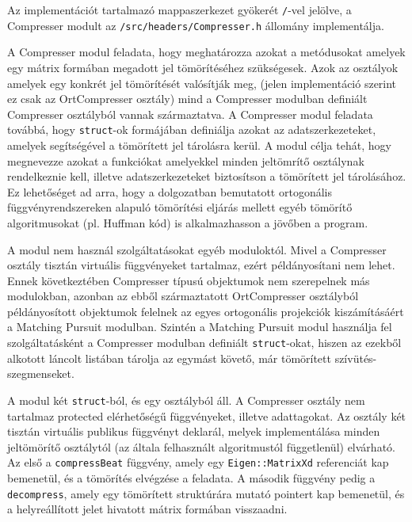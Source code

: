 \documentclass[oneside,titlepage,12pt,a4paper]{report}
\begin{document}
Az implementációt tartalmazó mappaszerkezet gyökerét \texttt{/}-vel jelölve, a Compresser modult  az \texttt{/src/headers/Compresser.h} állomány implementálja. 
\par A Compresser modul feladata, hogy meghatározza azokat a metódusokat amelyek egy mátrix formában megadott jel tömörítéséhez szükségesek. Azok az osztályok amelyek egy konkrét jel tömörítését valósítják meg, (jelen implementáció szerint ez csak az OrtCompresser osztály) mind a Compresser modulban definiált Compresser osztályból vannak származtatva. A Compresser modul feladata továbbá, hogy \texttt{struct}-ok formájában definiálja azokat az adatszerkezeteket, amelyek segítségével a tömörített jel tárolásra kerül. A modul célja tehát, hogy megnevezze azokat a funkciókat amelyekkel minden jeltömrítő osztálynak rendelkeznie kell, illetve adatszerkezeteket biztosítson a tömörített jel tárolásához. Ez lehetőséget ad arra, hogy a dolgozatban bemutatott ortogonális függvényrendszereken alapuló tömörítési eljárás mellett egyéb tömörítő algoritmusokat (pl. Huffman kód) is alkalmazhasson a jövőben a program.  
\par A modul nem használ szolgáltatásokat egyéb moduloktól. Mivel a Compresser osztály tisztán virtuális függvényeket tartalmaz, ezért példányosítani nem lehet. Ennek következtében Compresser típusú objektumok nem szerepelnek más modulokban, azonban az ebből származtatott OrtCompresser osztályból példányosított objektumok felelnek az egyes ortogonális projekciók kiszámításáért a Matching Pursuit modulban. Szintén a Matching Pursuit modul használja fel szolgáltatásként a Compresser modulban definiált \texttt{struct}-okat, hiszen az ezekből alkotott láncolt listában tárolja az egymást követő, már tömörített szívütés-szegmenseket. 
\par A modul két \texttt{struct}-ból, és egy osztályból áll. A Compresser osztály nem tartalmaz protected elérhetőségű függvényeket, illetve adattagokat. Az osztály két tisztán virtuális publikus függvényt deklarál, melyek implementálása minden jeltömörítő osztálytól (az általa felhasznált algoritmustól függetlenül) elvárható. Az első a \texttt{compressBeat} függvény, amely egy \texttt{Eigen::MatrixXd} referenciát kap bemenetül, és a tömörítés elvégzése a feladata. A második függvény pedig a \texttt{decompress}, amely egy tömörített struktúrára mutató pointert kap bemenetül, és a helyreállított jelet hivatott mátrix formában visszaadni. 
\end{document}
